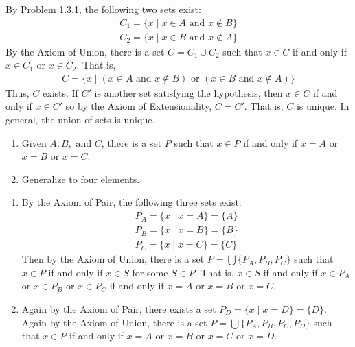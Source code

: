 \documentclass[class=report, crop=false]{standalone}
\begin{document}
  \begin{solution}
    By Problem 1.3.1, the following two sets exist:
    \begin{gather*}
      C_{1} = \{x \mid x \in A \text{ and } x \notin B\} \\
      C_{2} = \{x \mid x \in B \text{ and } x \notin A\}
    \end{gather*}
    By the Axiom of Union, there is a set \(C = C_{1} \cup C_{2}\) such that \(x \in C\) if and only if \(x \in C_{1}\) or \(x \in C_{2}\). That is,
    \begin{gather*}
      C = \{x \mid \left(x \in A \text{ and } x \notin B\right) \text{ or } \left(x \in B \text{ and } x \notin A\right)\}
    \end{gather*}
    Thus, \(C\) exists. If \(C'\) is another set satisfying the hypothesis, then \(x \in C\) if and only if \(x \in C'\) so by the Axiom of Extensionality, \(C = C'\). That is, \(C\) is unique. In general, the union of sets is unique.
  \end{solution}


  \begin{problem}
    \hfill
    \begin{enumerate}[label={(\alph*)}]
      \item Given \(A, B, \text{ and } C\), there is a set \(P\) such that \(x \in P\) if and only if \(x = A\) or \(x = B\) or \(x = C\).

      \item Generalize to four elements.
    \end{enumerate}
  \end{problem}

  \begin{solution}
    \hfill
    \begin{enumerate}[label={(\alph*)}]
      \item By the Axiom of Pair, the following three sets exist:
      \begin{gather*}
        P_{A} = \{x \mid x = A\} = \{A\} \\
        P_{B} = \{x \mid x = B\} = \{B\} \\
        P_{C} = \{x \mid x = C\} = \{C\}
      \end{gather*}
      Then by the Axiom of Union, there is a set \(P = \bigcup \{P_{A}, P_{B}, P_{C}\}\) such that \(x \in P\) if and only if \(x \in S\) for some \(S \in P\).
      That is, \(x \in S\) if and only if \(x \in P_{A}\) or \(x \in P_{B}\) or \(x \in P_{C}\) if and only if \(x = A\) or \(x = B\) or \(x = C\).

      \item Again by the Axiom of Pair, there exists a set \(P_{D} = \{x \mid x = D\} = \{D\}\). Again by the Axiom of Union, there is a set \(P = \bigcup \{P_{A}, P_{B}, P_{C}, P_{D}\}\) such that \(x \in P\) if and only if \(x = A\) or \(x = B\) or \(x = C\) or \(x = D\).
    \end{enumerate}
  \end{solution}
\end{document}
